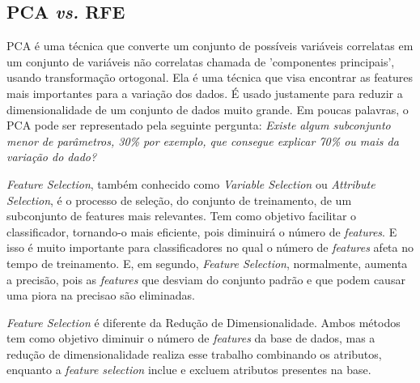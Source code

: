 \subsection{PCA \textit{vs.} RFE}
PCA é uma técnica que converte um conjunto de possíveis variáveis correlatas em um conjunto de variáveis não correlatas chamada de 'componentes principais', usando transformação ortogonal. Ela é uma técnica que visa encontrar as features mais importantes para a variação dos dados. É usado justamente para reduzir a dimensionalidade de um conjunto de dados muito grande. Em poucas palavras, o PCA pode ser representado pela seguinte pergunta: \textit{Existe algum subconjunto menor de parâmetros, 30\% por exemplo, que consegue explicar 70\% ou mais da variação do dado?}

\textit{Feature Selection}, também conhecido como \textit{Variable Selection} ou \textit{Attribute Selection}, é o processo de seleção, do conjunto de treinamento, de um subconjunto de features mais relevantes. Tem como objetivo facilitar o classificador, tornando-o mais eficiente, pois diminuirá o número de \textit{features}. E isso é muito importante para classificadores no qual o número de \textit{features} afeta no tempo de treinamento. E, em segundo, \textit{Feature Selection}, normalmente, aumenta a precisão, pois as \textit{features} que desviam do conjunto padrão e que podem causar uma piora na precisao são eliminadas.

\textit{Feature Selection} é diferente da Redução de Dimensionalidade. Ambos métodos tem como objetivo diminuir o número de \textit{features} da base de dados, mas a redução de dimensionalidade realiza esse trabalho combinando os atributos, enquanto a \textit{feature selection} inclue e excluem atributos presentes na base.

